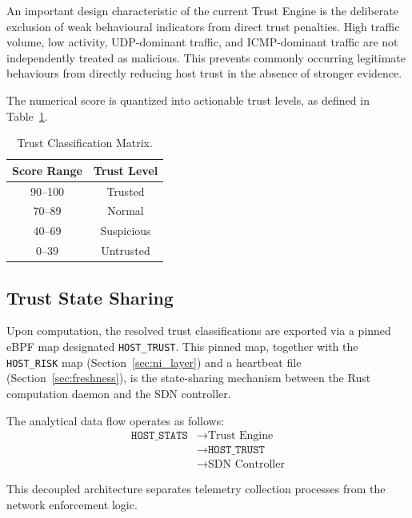\documentclass[conference]{IEEEtran}
\begin{document}
An important design characteristic of the current Trust Engine is the deliberate exclusion of weak behavioural indicators from direct trust penalties. High traffic volume, low activity, UDP-dominant traffic, and ICMP-dominant traffic are not independently treated as malicious. This prevents commonly occurring legitimate behaviours from directly reducing host trust in the absence of stronger evidence.

The numerical score is quantized into actionable trust levels, as defined in Table~\ref{tab:levels}.

\begin{table}[h]
\centering
\caption{Trust Classification Matrix.}
\label{tab:levels}
\begin{tabular}{cc}
\toprule
Score Range & Trust Level \\
\midrule
90--100 & Trusted \\
70--89 & Normal \\
40--69 & Suspicious \\
0--39 & Untrusted \\
\bottomrule
\end{tabular}
\end{table}

\subsection{Trust State Sharing}
Upon computation, the resolved trust classifications are exported via a pinned eBPF map designated \texttt{HOST\_TRUST}. This pinned map, together with the \texttt{HOST\_RISK} map (Section~\ref{sec:ni_layer}) and a heartbeat file (Section~\ref{sec:freshness}), is the state-sharing mechanism between the Rust computation daemon and the SDN controller.

The analytical data flow operates as follows:
\begin{equation}
\begin{aligned}
\texttt{HOST\_STATS} &\rightarrow \text{Trust Engine} \\
&\rightarrow \texttt{HOST\_TRUST} \\
&\rightarrow \text{SDN Controller}
\end{aligned}
\end{equation}

This decoupled architecture separates telemetry collection processes from the network enforcement logic.

\end{document}
